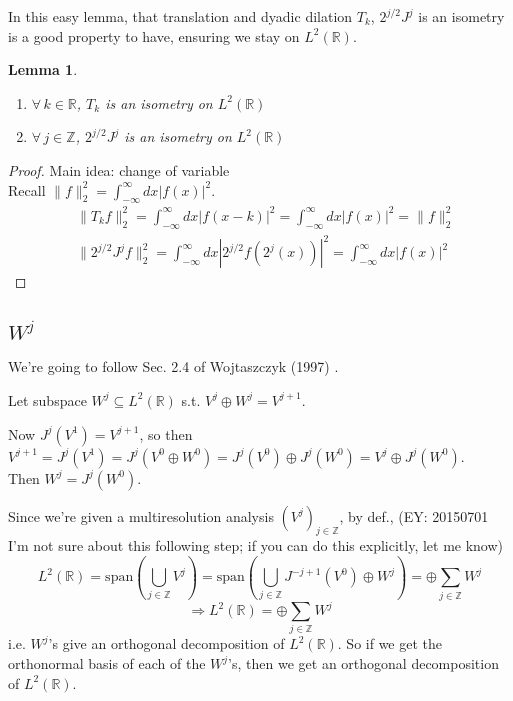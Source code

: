 \documentclass[twoside]{amsart}
\theoremstyle{plain}
\newtheorem{lemma}{Lemma}
\theoremstyle{definition}
\theoremstyle{remark}
\numberwithin{equation}{section}
\begin{document}
In this easy lemma, that translation and dyadic dilation $T_k$, $2^{j/2}J^j$ is an isometry is a good property to have, ensuring we stay on $L^2(\mathbb{R})$.  
\begin{lemma}
  \begin{enumerate}
  \item $\forall \, k \in \mathbb{R}$, $T_k$ is an isometry on $L^2(\mathbb{R})$ 
  \item  $\forall \, j \in \mathbb{Z}$, $2^{j/2}J^j$ is an isometry on $L^2(\mathbb{R})$
\end{enumerate}
\end{lemma}

\begin{proof}
  Main idea: change of variable \\
Recall $\| f\|_2^2 = \int_{-\infty}^{\infty} dx |f(x)|^2$.  
\[
\begin{aligned}
  & \| T_kf \|_2^2 = \int_{-\infty}^{\infty} dx |f(x-k)|^2 = \int_{-\infty}^{\infty} dx |f(x)|^2 = \| f\|_2^2 \\ 
  &  \| 2^{j/2} J^jf \|_2^2 = \int_{-\infty}^{\infty} dx | 2^{j/2} f(2^j(x)) |^2 = \int_{-\infty}^{\infty} dx |f(x)|^2
\end{aligned}
\]
\end{proof}

\subsection{$W^j$}
We're going to follow Sec. 2.4  of Wojtaszczyk (1997) \cite{PWojtaszczyk1997}.  

Let subspace $W^j \subseteq L^2(\mathbb{R})$ s.t. $V^j \oplus W^j = V^{j+1}$.  

Now $J^j(V^1) = V^{j+1}$, so then \\
\phantom{Now} $V^{j+1} = J^j(V^1) = J^j(V^0 \oplus W^0) = J^j(V^0) \oplus J^j(W^0) = V^j \oplus J^j(W^0)$.  \\
Then $W^j = J^j(W^0)$.  

Since we're given a multiresolution analysis $(V^j)_{j\in \mathbb{Z}}$, by def., (EY: 20150701 I'm not sure about this following step; if you can do this explicitly, let me know)
\[
L^2(\mathbb{R}) = \text{span}(\bigcup_{j\in \mathbb{Z}} V^j) = \text{span}(\bigcup_{j\in \mathbb{Z}} J^{-j+1}(V^0) \oplus W^j ) = \oplus \sum_{j\in \mathbb{Z}} W^j
\]
\[
\Longrightarrow L^2(\mathbb{R}) = \oplus \sum_{j\in \mathbb{Z}} W^j
\]
i.e. $W^j$'s give an orthogonal decomposition of $L^2(\mathbb{R})$.  So if we get the orthonormal basis of each of the $W^j$'s, then we get an orthogonal decomposition of $L^2(\mathbb{R})$.  
\end{document}
